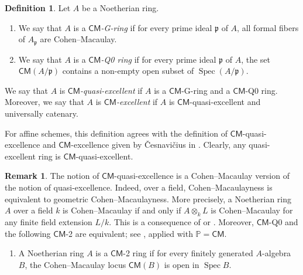 \documentclass[a4paper, 11pt]{amsart}
\theoremstyle{definition}
\newtheorem{definition}[theorem]{Definition}
\newtheorem{remark}[theorem]{Remark}
\newcommand{\Spec}{\operatorname{Spec}}
\begin{document}
\begin{definition}\label{def:CM-quasi-excellent}
    Let $A$ be a Noetherian ring. 
    \begin{enumerate}
        \item We say that $A$ is a \emph{$\mathsf{CM}$\textnormal{-G-}ring} if for every prime ideal $\mathfrak{p}$ of $A$, all formal fibers of $A_\mathfrak{p}$ are Cohen--Macaulay.
        \item We say that $A$ is a \emph{$\mathsf{CM}$\textnormal{-Q0} ring} if for every prime ideal $\mathfrak{p}$ of $A$, the set $\mathsf{CM}(A/\mathfrak{p})$ contains a non-empty open subset of $\Spec(A/\mathfrak{p})$.
    \end{enumerate}
    We say that $A$ is \emph{$\mathsf{CM}$-quasi-excellent} if $A$ is a $\mathsf{CM}$\textnormal{-G-}ring and a $\mathsf{CM}$\textnormal{-Q0} ring. Moreover, we say that $A$ is \emph{$\mathsf{CM}$-excellent} if $A$ is $\mathsf{CM}$-quasi-excellent and universally catenary.
\end{definition}

For affine schemes, this definition agrees with the definition of $\mathsf{CM}$-quasi-excellence and $\mathsf{CM}$-excellence given by \v{C}esnavi\v{c}ius in \cite[Definition~1.2]{Ces21}. Clearly, any quasi-excellent ring is $\mathsf{CM}$-quasi-excellent. 

\begin{remark}\label{rem:CM-quasi-excellent}
    The notion of $\mathsf{CM}$-quasi-excellence is a Cohen--Macaulay version of the notion of quasi-excellence. Indeed, over a field, Cohen--Macaulayness is equivalent to geometric Cohen--Macaulayness. More precisely, a Noetherian ring $A$ over a field $k$ is Cohen--Macaulay if and only if $A \otimes_k L$ is Cohen--Macaulay for any finite field extension $L/k$. This is a consequence of \cite[\href{https://stacks.math.columbia.edu/tag/045N}{Tag 045N}]{stacks-project} or \cite[Theorem~23.6 and its Remark]{Mat86}. Moreover, $\mathsf{CM}$-Q0 and the following $\mathsf{CM}$-2 are equivalent; see \cite[Proposition 3.10]{Ike26}, applied with $\mathbb{P} = \mathsf{CM}$. 
    \begin{enumerate}
        \item[($\mathsf{CM}$-2)] A Noetherian ring $A$ is a $\mathsf{CM}$\textnormal{-2} ring if for every finitely generated $A$-algebra $B$, the Cohen--Macaulay locus $\mathsf{CM}(B)$ is open in $\Spec B$. 
    \end{enumerate}
\end{remark}
\end{document}
